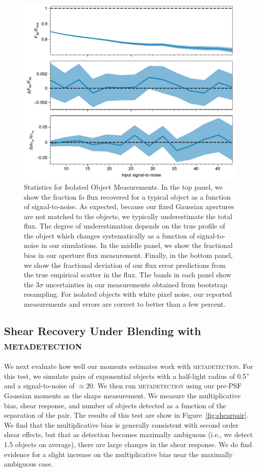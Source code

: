 \documentclass[twocolappendix, appendixfloats, numberedappendix, twocolumn, apj]{openjournal}
\newcommand{\mdet}{\textsc{metadetection}\xspace}
\begin{document}
\begin{figure}
  \centering
  \includegraphics[width=\columnwidth]{figures/test-noround-nodetect.pdf}
  \caption{
    Statistics for Isolated Object Measurements. In the top panel, we show the
    fraction fo flux recovered for a typical object as a function of signal-to-noise.
    As expected, because our fixed Gaussian apertures are not matched to the objects,
    we typically underestimate the total flux. The degree of underestimation depends on
    the true profile of the object which changes systematically as a function of
    signal-to-noise in our simulations. In the middle panel, we show the fractional bias in
    our aperture flux measurement. Finally, in the bottom panel,
    we show the fractional deviation of our flux error predictions from the true
    empirical scatter in the flux. The bands in each panel show the $3\sigma$ uncertainties
    in our measurements obtained from bootstrap resampling. For isolated objects
    with white pixel noise, our reported measurements and errors are correct to
    better than a few percent.
    \label{fig:noround_nodetect}
  }
\end{figure}


\subsection{Shear Recovery Under Blending with \mdet}

We next evaluate how well our moments estimates work with \mdet. For this test,
we simulate pairs of exponential objects with a half-light radius of 0.5'' and a
signal-to-noise of $\approx20$. We then run \mdet using our pre-PSF Gaussian moments
as the shape measurement. We measure the multiplicative bias, shear response, and
number of objects detected as a function of the separation of the pair. The results
of this test are show in Figure~\ref{fig:shearpair}. We find that the multiplicative
bias is generally consistent with second order shear effects, but that as detection
becomes maximally ambiguous (i.e., we detect 1.5 objects on average), there are large
changes in the shear response. We do find evidence for a slight increase on the
multiplicative bias near the maximally ambiguous case.
\end{document}
